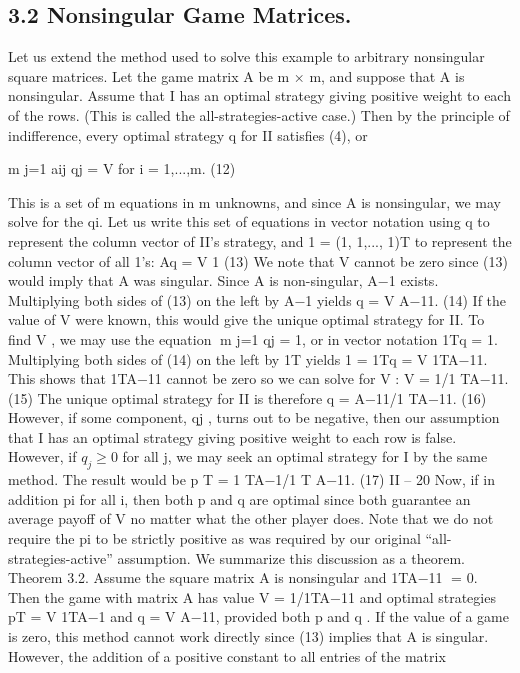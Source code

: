 \documentclass[]{report}
\begin{document}
\subsection{3.2 Nonsingular Game Matrices.} Let us extend the method used to solve this
example to arbitrary nonsingular square matrices. Let the game matrix A be m × m,
and suppose that A is nonsingular. Assume that I has an optimal strategy giving positive
weight to each of the rows. (This is called the all-strategies-active case.) Then by the
principle of indifference, every optimal strategy q for II satisfies (4), or

m
j=1
aij qj = V for i = 1,...,m. (12)

This is a set of m equations in m unknowns, and since A is nonsingular, we may solve
for the qi. Let us write this set of equations in vector notation using q to represent the
column vector of II’s strategy, and 1 = (1, 1,..., 1)T to represent the column vector of all
1’s:
Aq = V 1 (13)
We note that V cannot be zero since (13) would imply that A was singular. Since A is
non-singular, A−1 exists. Multiplying both sides of (13) on the left by A−1 yields
q = V A−11. (14)
If the value of V were known, this would give the unique optimal strategy for II. To find
V , we may use the equation m
j=1 qj = 1, or in vector notation 1Tq = 1. Multiplying both
sides of (14) on the left by 1T yields 1 = 1Tq = V 1TA−11. This shows that 1TA−11 cannot
be zero so we can solve for V :
V = 1/1
TA−11. (15)
The unique optimal strategy for II is therefore
q = A−11/1
TA−11. (16)
However, if some component, qj , turns out to be negative, then our assumption that I has
an optimal strategy giving positive weight to each row is false.
However, if $q_j \geq 0$ for all j, we may seek an optimal strategy for I by the same method.
The result would be
p
T = 1
TA−1/1
T
A−11. (17)
II – 20
Now, if in addition pi  for all i, then both p and q are optimal since both guarantee an
average payoff of V no matter what the other player does. Note that we do not require the
pi to be strictly positive as was required by our original “all-strategies-active” assumption.
We summarize this discussion as a theorem.
Theorem 3.2. Assume the square matrix A is nonsingular and 1TA−11 = 0. Then the
game with matrix A has value V = 1/1TA−11 and optimal strategies pT = V 1TA−1 and
q = V A−11, provided both p  and q .
If the value of a game is zero, this method cannot work directly since (13) implies
that A is singular. However, the addition of a positive constant to all entries of the matrix
\end{document}
